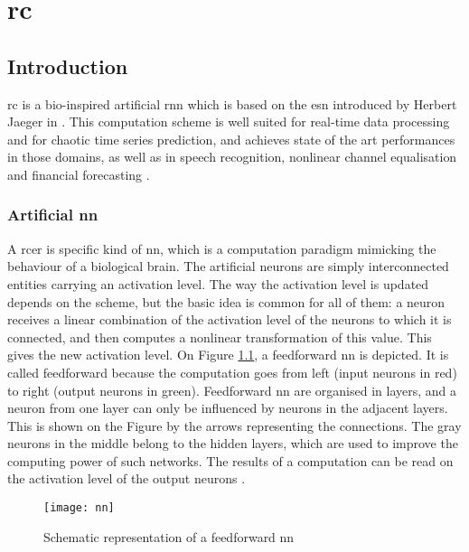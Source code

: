 \chapter{\acrlong{rc}}
\label{rc}

\section{Introduction}


\gls{rc} is a bio-inspired artificial \gls{rnn} which is based on the \gls{esn} introduced by Herbert Jaeger in \cite{Jaeger2004}. This computation scheme is well suited for real-time data processing and for chaotic time series prediction\cite{Jaeger2004, JaegerH.2001Tesa, Lukoeviius2012}, and achieves state of the art performances in those domains, as well as in speech recognition\cite{Verstraeten2006, NIPS2010_4056, Jaeger2007}, nonlinear channel equalisation\cite{Jaeger2004} and financial forecasting \cite{financialTimeSeries}.\\

\subsection{Artificial \acrlong{nn}}

A \gls{rcer} is specific kind of \gls{nn}, which is a computation paradigm mimicking the behaviour of a biological brain. The artificial neurons are simply interconnected entities carrying an activation level. The way the activation level is updated depends on the scheme, but the basic idea is common for all of them: a neuron receives a linear combination of the activation level of the neurons to which it is connected, and then computes a nonlinear transformation of this value. This gives the new activation level. On Figure \ref{nn}, a feedforward \gls{nn} is depicted. It is called feedforward because the computation goes from left (input neurons in red) to right (output neurons in green). Feedforward \gls{nn} are organised in layers, and a neuron from one layer can only be influenced by neurons in the adjacent layers. This is shown on the Figure by the arrows representing the connections. The gray neurons in the middle belong to the hidden layers, which are used to improve the computing power of such networks. The results of a computation can be read on the activation level of the output neurons \cite[p.727]{russell2010artificial}\cite[p.225]{bishop2006pattern}.

\begin{figure}[h]
	\centering
	\texttt{[image: nn]}
	\caption{Schematic representation of a feedforward \gls{nn}}
	\label{nn}
\end{figure}

